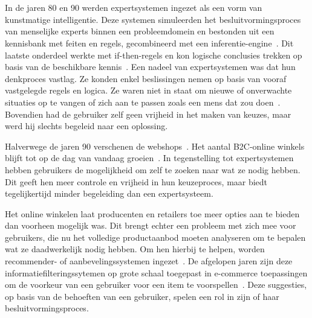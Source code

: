 
\chapter{}%
\label{ch:inleiding}

In de jaren 80 en 90 werden expertsystemen ingezet als een vorm van kunstmatige intelligentie. Deze systemen simuleerden het besluitvormingsproces van menselijke experts binnen een probleemdomein en bestonden uit een kennisbank met feiten en regels, gecombineerd met een inferentie-engine~\autocite{Angeli2010,Castillo2012}. Dit laatste onderdeel werkte met if-then-regels en kon logische conclusies trekken op basis van de beschikbare kennis~\autocite{Buchanan1988}. Een nadeel van expertsystemen was dat hun denkproces vastlag. Ze konden enkel beslissingen nemen op basis van vooraf vastgelegde regels en logica. Ze waren niet in staat om nieuwe of onverwachte situaties op te vangen of zich aan te passen zoals een mens dat zou doen~\autocite{Castillo2012}. Bovendien had de gebruiker zelf geen vrijheid in het maken van keuzes, maar werd hij slechts begeleid naar een oplossing.\par
\medskip
Halverwege de jaren 90 verschenen de webshops~\autocite{Chu2007}. Het aantal B2C-online winkels blijft tot op de dag van vandaag groeien~\autocite{Pokki2016}. In tegenstelling tot expertsystemen hebben gebruikers de mogelijkheid om zelf te zoeken naar wat ze nodig hebben. Dit geeft hen meer controle en vrijheid in hun keuzeproces, maar biedt tegelijkertijd minder begeleiding dan een expertsysteem.\par
\medskip
Het online winkelen laat producenten en retailers toe meer opties aan te bieden dan voorheen mogelijk was. Dit brengt echter een probleem met zich mee voor gebruikers, die nu het volledige productaanbod moeten analyseren om te bepalen wat ze daadwerkelijk nodig hebben. Om hen hierbij te helpen, worden recom\-mender- of aanbevelingssystemen ingezet~\autocite{Sivapalan2014}. De afgelopen jaren zijn deze informatiefilteringssytemen op grote schaal toegepast in e-com\-merce toepassingen om de voorkeur van een gebruiker voor een item te voorspellen~\autocite{Thorat2015}. Deze suggesties, op basis van de behoeften van een gebruiker, spelen een rol in zijn of haar besluitvormingsproces.\par

